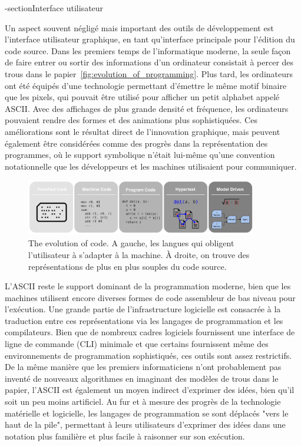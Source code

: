 {\sous-section{Interface utilisateur}

Un aspect souvent négligé mais important des outils de développement est l'interface utilisateur graphique, en tant qu'interface principale pour l'édition du code source. Dans les premiers temps de l'informatique moderne, la seule façon de faire entrer ou sortir des informations d'un ordinateur consistait à percer des trous dans le papier~\autoref{fig:evolution_of_programming}. Plus tard, les ordinateurs ont été équipés d'une technologie permettant d'émettre le même motif binaire que les pixels, qui pouvait être utilisé pour afficher un petit alphabet appelé ASCII. Avec des affichages de plus grande densité et fréquence, les ordinateurs pouvaient rendre des formes et des animations plus sophistiquées. Ces améliorations sont le résultat direct de l'innovation graphique, mais peuvent également être considérées comme des progrès dans la représentation des programmes, où le support symbolique n'était lui-même qu'une convention notationnelle que les développeurs et les machines utilisaient pour communiquer.

\begin{figure}
\center
\includegraphics[width=0.90\textwidth]{../figures/progress_in_program.png}
\caption{The evolution of code. A gauche, les langues qui obligent l'utilisateur à s'adapter à la machine. À droite, on trouve des représentations de plus en plus souples du code source.}
\label{fig:evolution_of_programming}
\end{figure}

L'ASCII reste le support dominant de la programmation moderne, bien que les machines utilisent encore diverses formes de code assembleur de bas niveau pour l'exécution. Une grande partie de l'infrastructure logicielle est consacrée à la traduction entre ces représentations via les langages de programmation et les compilateurs. Bien que de nombreux cadres logiciels fournissent une interface de ligne de commande (CLI) minimale et que certains fournissent même des environnements de programmation sophistiqués, ces outils sont assez restrictifs. De la même manière que les premiers informaticiens n'ont probablement pas inventé de nouveaux algorithmes en imaginant des modèles de trous dans le papier, l'ASCII est également un moyen indirect d'exprimer des idées, bien qu'il soit un peu moins artificiel. Au fur et à mesure des progrès de la technologie matérielle et logicielle, les langages de programmation se sont déplacés "vers le haut de la pile", permettant à leurs utilisateurs d'exprimer des idées dans une notation plus familière et plus facile à raisonner sur son exécution.

}
